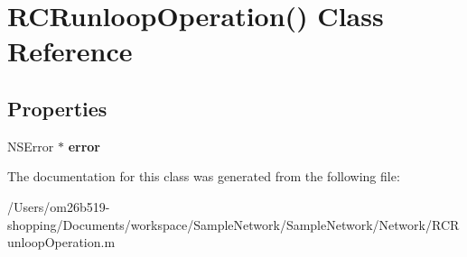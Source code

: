 \hypertarget{interface_r_c_runloop_operation_07_08}{\section{R\-C\-Runloop\-Operation() Class Reference}
\label{interface_r_c_runloop_operation_07_08}
}
\subsection*{Properties}
\begin{DoxyCompactItemize}
\item 
\hypertarget{interface_r_c_runloop_operation_07_08_ae3e199ef0192862db7ef2aed8f397fa1}{N\-S\-Error $\ast$ {\bfseries error}}\label{interface_r_c_runloop_operation_07_08_ae3e199ef0192862db7ef2aed8f397fa1}

\end{DoxyCompactItemize}


The documentation for this class was generated from the following file\-:\begin{DoxyCompactItemize}
\item 
/\-Users/om26b519-\/shopping/\-Documents/workspace/\-Sample\-Network/\-Sample\-Network/\-Network/R\-C\-Runloop\-Operation.\-m\end{DoxyCompactItemize}
